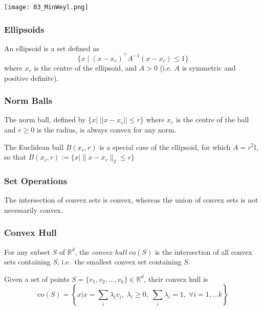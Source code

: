 \begin{center}
    \texttt{[image: 03\_MinWeyl.png]}
\end{center}

\subsubsection{Ellipsoids}
An ellipsoid is a set defined as
\begin{equation*}
    \{x \mid {(x - x_c)}^\top A^{-1}(x - x_c) \leq 1\}
\end{equation*}
where $x_c$ is the centre of the ellipsoid, and $A > 0$ (i.e. $A$ is symmetric and positive definite).   %

\subsubsection{Norm Balls}
The norm ball, defined by $\{x|\;||x-x_{\mathrm{c}}||\leq r\}$ where $x_{\mathrm{c}}$ is the centre of the ball
and $r\geq0$ is the radius, is always convex for any norm.
\newpar{}

The Euclidean ball $B(x_c,r)$ is a special case of the ellipsoid, for which $A=r^2 \mathbb{I}$, so that $B(x_c,r):=\{x| \|x-x_c\|_2\leq r\}$

\subsubsection{Set Operations}
The intersection of convex sets is convex, whereas the union of convex sets is not necessarily convex.

\subsubsection{Convex Hull}\label{ssec:convex_hull}
For any subset $S$ of $\mathbb{R}^d$, the \textit{convex hull} $\mathrm{co}(S)$ is the intersection of all convex sets containing $S$, i.e.\ the smallest convex set containing $S$.

\newpar{}

Given a set of points $S=\{v_1, v_2, \ldots, v_k\} \in \mathbb{R}^d$, their convex hull is
\begin{equation*}
    \mathrm{co}(S) = \left\{ x\Bigg| x = \sum_i \lambda_i v_i, \; \lambda_i \geq 0,\; \sum_i \lambda_i = 1,\; \forall i=1,\ldots k \right\}
\end{equation*}

